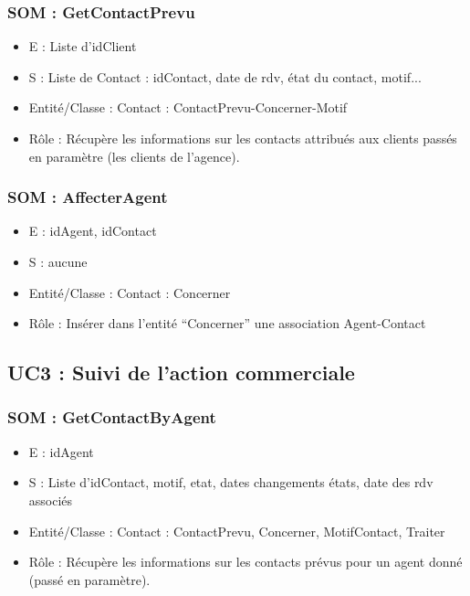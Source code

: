 \subsubsection{SOM : GetContactPrevu}
	\begin{itemize}
		\item E : Liste d’idClient
		\item S : Liste de Contact : idContact, date de rdv, état du contact, motif...
		\item Entité/Classe : Contact : ContactPrevu-Concerner-Motif
		\item Rôle : Récupère les informations sur les contacts attribués aux clients passés en
	paramètre (les clients de l’agence).
	\end{itemize}

\subsubsection{SOM : AffecterAgent}
	\begin{itemize}
		\item E : idAgent, idContact
		\item S : aucune
		\item Entité/Classe : Contact : Concerner
		\item Rôle : Insérer dans l’entité “Concerner” une association Agent-Contact
	\end{itemize}



\subsection{UC3 : Suivi de l’action commerciale}
\subsubsection{SOM : GetContactByAgent}
	\begin{itemize}
		\item E : idAgent
		\item S : Liste d’idContact, motif, etat, dates changements états, date des rdv associés
		\item Entité/Classe : Contact : ContactPrevu, Concerner, MotifContact, Traiter
		\item Rôle : Récupère les informations sur les contacts prévus pour un agent donné
	(passé en paramètre).
	\end{itemize}



